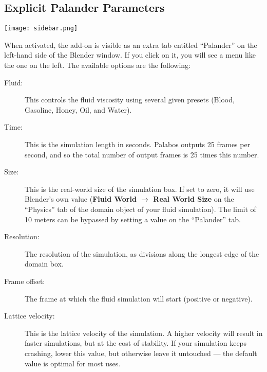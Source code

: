 \documentclass[12pt]{article}
\begin{document}
\subsection{Explicit Palander Parameters}

\begin{minipage}{0.25\textwidth}
\texttt{[image: sidebar.png]}
\end{minipage}
\begin{minipage}{0.75\textwidth}
When activated, the add-on is visible as an extra tab entitled ``Palander'' on the left-hand side of the 
Blender window. If you click on it, you will see a menu like the one on the left. The available options are 
the following:
\begin{description}
\item[Fluid:] This controls the fluid viscosity using several given presets (Blood, Gasoline, Honey, Oil, and 
Water).
\item[Time:] This is the simulation length in seconds. Palabos outputs 25 frames per second, and so the total 
number of output frames is 25 times this number.
\item[Size:] This is the real-world size of the simulation box. If set to zero, it will use Blender's own 
value ({\bf Fluid World $\to$ Real World Size} on the ``Physics'' tab of the domain object of your fluid 
simulation). The limit of 10 meters can be bypassed by setting a value on the ``Palander'' tab.
\item[Resolution:] The resolution of the simulation, as divisions along the longest edge of the domain box.
\item[Frame offset:] The frame at which the fluid simulation will start (positive or negative).
\item[Lattice velocity:] This is the lattice velocity of the simulation. A higher velocity will result in 
faster simulations, but at the cost of stability. If your simulation keeps crashing, lower this value, but 
otherwise leave it untouched --- the default value is optimal for most uses.
\end{description}
\end{minipage}
\end{document}
